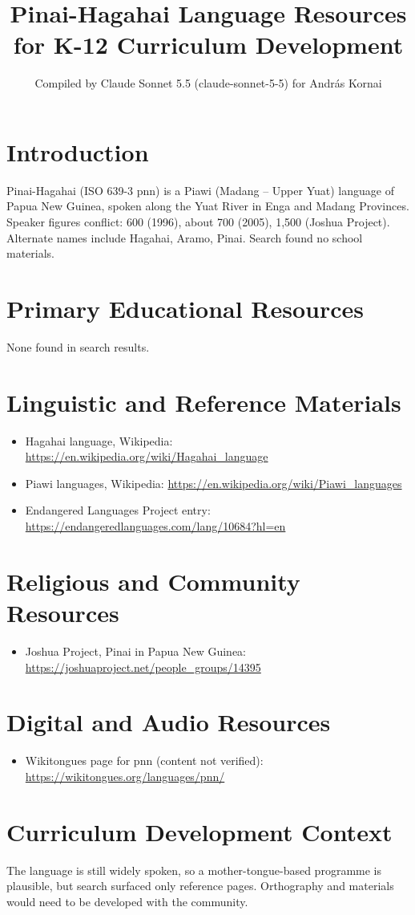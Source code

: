 \documentclass[12pt]{article}
\title{Pinai-Hagahai Language Resources for K-12 Curriculum Development}
\author{Compiled by Claude Sonnet 5.5 (claude-sonnet-5-5) for Andr\'as Kornai}
\date{}
\begin{document}
\maketitle

\section{Introduction}
Pinai-Hagahai (ISO 639-3 pnn) is a Piawi (Madang -- Upper Yuat) language of Papua New Guinea, spoken along the Yuat River in Enga and Madang Provinces. Speaker figures conflict: 600 (1996), about 700 (2005), 1,500 (Joshua Project). Alternate names include Hagahai, Aramo, Pinai. Search found no school materials.

\section{Primary Educational Resources}
None found in search results.

\section{Linguistic and Reference Materials}
\begin{itemize}
\item Hagahai language, Wikipedia: \url{https://en.wikipedia.org/wiki/Hagahai_language}
\item Piawi languages, Wikipedia: \url{https://en.wikipedia.org/wiki/Piawi_languages}
\item Endangered Languages Project entry: \url{https://endangeredlanguages.com/lang/10684?hl=en}
\end{itemize}

\section{Religious and Community Resources}
\begin{itemize}
\item Joshua Project, Pinai in Papua New Guinea: \url{https://joshuaproject.net/people_groups/14395}
\end{itemize}

\section{Digital and Audio Resources}
\begin{itemize}
\item Wikitongues page for pnn (content not verified): \url{https://wikitongues.org/languages/pnn/}
\end{itemize}

\section{Curriculum Development Context}
The language is still widely spoken, so a mother-tongue-based programme is plausible, but search surfaced only reference pages. Orthography and materials would need to be developed with the community.
\end{document}
